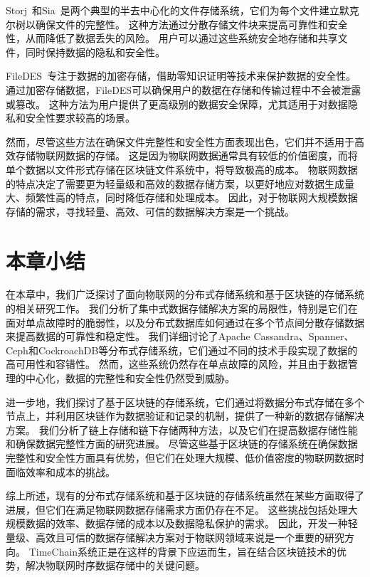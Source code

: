 Storj~\cite{storj2018storj}和Sia~\cite{vorick2014sia}是两个典型的半去中心化的文件存储系统，它们为每个文件建立默克尔树以确保文件的完整性。
这种方法通过分散存储文件块来提高可靠性和安全性，从而降低了数据丢失的风险。
用户可以通过这些系统安全地存储和共享文件，同时保持数据的隐私和安全性。

FileDES~\cite{xu2024filedes}专注于数据的加密存储，借助零知识证明等技术来保护数据的安全性。
通过加密存储数据，FileDES可以确保用户的数据在存储和传输过程中不会被泄露或篡改。
这种方法为用户提供了更高级别的数据安全保障，尤其适用于对数据隐私和安全性要求较高的场景。

然而，尽管这些方法在确保文件完整性和安全性方面表现出色，它们并不适用于高效存储物联网数据的存储。
这是因为物联网数据通常具有较低的价值密度，而将单个数据以文件形式存储在区块链文件系统中，将导致极高的成本。
物联网数据的特点决定了需要更为轻量级和高效的数据存储方案，以更好地应对数据生成量大、频繁性高的特点，同时降低存储和处理成本。
因此，对于物联网大规模数据存储的需求，寻找轻量、高效、可信的数据解决方案是一个挑战。

\section{本章小结}
在本章中，我们广泛探讨了面向物联网的分布式存储系统和基于区块链的存储系统的相关研究工作。
我们分析了集中式数据存储解决方案的局限性，特别是它们在面对单点故障时的脆弱性，以及分布式数据库如何通过在多个节点间分散存储数据来提高数据的可靠性和稳定性。
我们详细讨论了Apache Cassandra、Spanner、Ceph和CockroachDB等分布式存储系统，它们通过不同的技术手段实现了数据的高可用性和容错性。
然而，这些系统仍然存在单点故障的风险，并且由于数据管理的中心化，数据的完整性和安全性仍然受到威胁。

进一步地，我们探讨了基于区块链的存储系统，它们通过将数据分布式存储在多个节点上，并利用区块链作为数据验证和记录的机制，提供了一种新的数据存储解决方案。
我们分析了链上存储和链下存储两种方法，以及它们在提高数据存储性能和确保数据完整性方面的研究进展。
尽管这些基于区块链的存储系统在确保数据完整性和安全性方面具有优势，但它们在处理大规模、低价值密度的物联网数据时面临效率和成本的挑战。

综上所述，现有的分布式存储系统和基于区块链的存储系统虽然在某些方面取得了进展，但它们在满足物联网数据存储需求方面仍存在不足。
这些挑战包括处理大规模数据的效率、数据存储的成本以及数据隐私保护的需求。
因此，开发一种轻量级、高效且可信的数据存储解决方案对于物联网领域来说是一个重要的研究方向。
TimeChain系统正是在这样的背景下应运而生，旨在结合区块链技术的优势，解决物联网时序数据存储中的关键问题。


